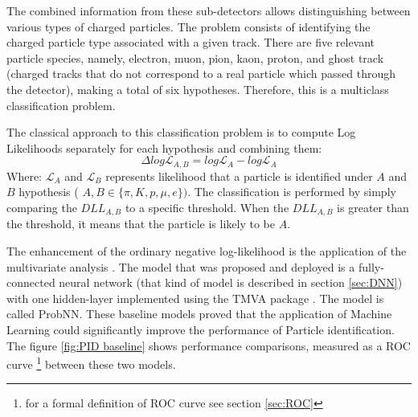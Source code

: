 The combined information from these sub-detectors allows distinguishing between various types of charged particles. The problem consists of identifying the charged particle type associated with a given track. There are five relevant particle species, namely, electron, muon, pion, kaon, proton, and ghost track (charged tracks that do not correspond to a real particle which passed through the detector), making a total of six hypotheses. Therefore, this is a multiclass classification problem. 

The classical approach to this classification problem is to compute Log Likelihoods separately for each hypothesis and combining them: 
\begin{equation}
\Delta log \mathcal{L}_{A,B} = log \mathcal{L}_{A} - log \mathcal{L}_{A}  
\end{equation}
Where: $ \mathcal{L}_{A}$ and $ \mathcal{L}_{B}$ represents likelihood that a particle is identified under $A$ and $B$ hypothesis ( $A, B  \in \{ \pi, K, p, \mu, e \})$. The classification is performed by simply comparing the $DLL_{A,B}$ to a specific threshold. When the $DLL_{A,B}$ is greater than the threshold, it means that the particle is likely to be $A$. 

The enhancement of the ordinary negative log-likelihood is the application of the multivariate analysis \cite{PID}. The model that was proposed and deployed is a fully-connected neural network (that kind of model is described in section \ref{sec:DNN}) with one hidden-layer implemented using the TMVA package \cite{TMVA}. The model is called ProbNN. These baseline models proved that the application of Machine Learning could significantly improve the performance of Particle identification. The figure \ref{fig:PID baseline} shows performance comparisons, measured as a ROC curve \footnote{for a formal definition of ROC curve see section \ref{sec:ROC}} between these two models.

